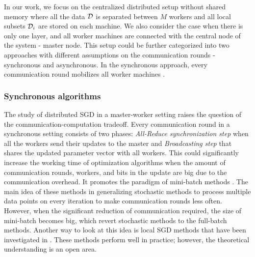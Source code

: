 In our work, we focus on the centralized distributed setup without shared memory \cite{mishchenko2018} where all the data $\mathcal{D}$ is separated between $M$ workers and all local subsets $\mathcal{D}_i$ are stored on each machine. {We also consider the case when there is only one layer, and all worker machines are connected with the central node of the system - master node. }This setup could be further categorized into two approaches with different assumptions on the communication rounds - synchronous and asynchronous. In the synchronous approach, every communication round mobilizes all worker machines \cite{BoydPCPE11,Chen2016,Tsianos12}. 

\subsubsection{Synchronous algorithms}
The study of distributed SGD in a master-worker setting \cite{yang2013trading} raises the question of the communication-computation tradeoff. {Every communication round in a synchronous setting consists of two phases: \emph{All-Reduce synchronization step} when all the workers send their updates to the master and \emph{Broadcasting step} that shares the updated parameter vector with all workers. This could significantly increase the working time of optimization algorithms when the amount of communication rounds, workers, and bits in the update are big due to the communication overhead.} It promotes the paradigm of mini-batch methods \cite{dekel2012optimal, shalev2013accelerated, shamir2014distributed, qu2016coordinate, takavc2015distributed}. The main idea of these methods in generalizing stochastic methods to process multiple data points on every iteration to make communication rounds less often. However, when the significant reduction of communication required, the size of mini-batch becomes big, which revert stochastic methods to the full-batch methods. Another way to look at this idea is local SGD methods that have been investigated in \cite{stich2018local,khaled2019first,khaled2020tighter,li2019federated,ma2017distributed}. These methods perform well in practice; however, the theoretical understanding is an open area.


